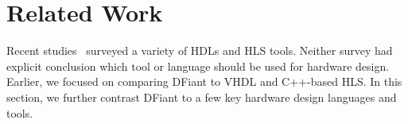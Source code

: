 \section{Related Work}
\label{sec:related_work}


Recent studies~\cite{Kapre2016}\cite{Nane2016}\cite{Windh2015} surveyed a variety of HDLs and HLS tools. Neither survey had explicit conclusion which tool or language should be used for hardware design. Earlier, we focused on comparing DFiant to VHDL and C++-based HLS. In this section, we further contrast DFiant to a few key hardware design languages and tools.





